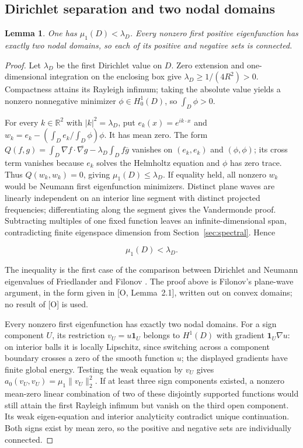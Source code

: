 \documentclass[11pt]{article}
\newtheorem{lemma}[theorem]{Lemma}
\theoremstyle{definition}
\theoremstyle{remark}
\numberwithin{equation}{section}
\begin{document}
\subsection{Dirichlet separation and two nodal domains}\label{subsec:12.1}
\begin{lemma}\label{lem:dirichlet-separation}
One has $\mu_1(D)<\lambda_D$. Every nonzero first positive eigenfunction has exactly two nodal domains, so each of its positive and negative sets is connected.
\end{lemma}
\begin{proof}

Let $\lambda_D$ be the first Dirichlet value on $D$. Zero extension and one-dimensional integration on the enclosing box give $\lambda_D\ge1/(4R^2)>0$. Compactness attains its Rayleigh infimum; taking the absolute value yields a nonzero nonnegative minimizer $\phi\in H^1_0(D)$, so $\int_D\phi>0$.

For every $k\in\mathbb R^2$ with $|k|^2=\lambda_D$, put $e_k(x)=e^{ik\cdot x}$ and $w_k=e_k-(\int_De_k/\int_D\phi)\phi$. It has mean zero. The form $Q(f,g)=\int_D\nabla f\cdot\overline{\nabla g}-\lambda_D\int_Df\overline g$ vanishes on $(e_k,e_k)$ and $(\phi,\phi)$; its cross term vanishes because $e_k$ solves the Helmholtz equation and $\phi$ has zero trace. Thus $Q(w_k,w_k)=0$, giving $\mu_1(D)\le\lambda_D$. If equality held, all nonzero $w_k$ would be Neumann first eigenfunction minimizers. Distinct plane waves are linearly independent on an interior line segment with distinct projected frequencies; differentiating along the segment gives the Vandermonde proof. Subtracting multiples of one fixed function leaves an infinite-dimensional span, contradicting finite eigenspace dimension from Section~\ref{sec:spectral}. Hence

\begin{equation}\label{eq:src-12-01}
\mu_1(D)<\lambda_D.
\end{equation}

The inequality is the first case of the comparison between Dirichlet and Neumann eigenvalues of Friedlander \cite{Friedlander} and Filonov \cite{Filonov}. The proof above is Filonov's plane-wave argument, in the form given in [O, Lemma~2.1], written out on convex domains; no result of [O] is used.

Every nonzero first eigenfunction has exactly two nodal domains. For a sign component $U$, its restriction $v_U=u\mathbf1_U$ belongs to $H^1(D)$ with gradient $\mathbf1_U\nabla u$: on interior balls it is locally Lipschitz, since switching across a component boundary crosses a zero of the smooth function $u$; the displayed gradients have finite global energy. Testing the weak equation by $v_U$ gives $a_0(v_U,v_U)=\mu_1\|v_U\|_2^2$. If at least three sign components existed, a nonzero mean-zero linear combination of two of these disjointly supported functions would still attain the first Rayleigh infimum but vanish on the third open component. Its weak eigen-equation and interior analyticity contradict unique continuation. Both signs exist by mean zero, so the positive and negative sets are individually connected.

\end{proof}
\end{document}
